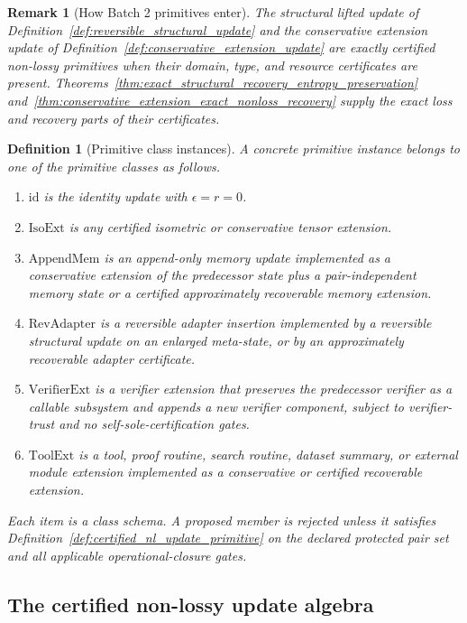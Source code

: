 \documentclass[11pt]{article}
\newtheorem{definition}[theorem]{Definition}
\newtheorem{remark}[theorem]{Remark}
\newcommand{\1}{\mathbf{1}}
\begin{document}
\begin{remark}[How Batch 2 primitives enter]
The structural lifted update of Definition~\ref{def:reversible_structural_update} and the conservative extension update of Definition~\ref{def:conservative_extension_update} are exactly certified non-lossy primitives when their domain, type, and resource certificates are present.  Theorems~\ref{thm:exact_structural_recovery_entropy_preservation} and~\ref{thm:conservative_extension_exact_nonloss_recovery} supply the exact loss and recovery parts of their certificates.
\end{remark}

\begin{definition}[Primitive class instances]
\label{def:primitive_class_instances}
A concrete primitive instance belongs to one of the primitive classes as follows.
\begin{enumerate}[label=(\alph*),leftmargin=1.5em]
    \item \(\mathrm{id}\) is the identity update with \(\epsilon=r=0\).
    \item \(\mathrm{IsoExt}\) is any certified isometric or conservative tensor extension.
    \item \(\mathrm{AppendMem}\) is an append-only memory update implemented as a conservative extension of the predecessor state plus a pair-independent memory state or a certified approximately recoverable memory extension.
    \item \(\mathrm{RevAdapter}\) is a reversible adapter insertion implemented by a reversible structural update on an enlarged meta-state, or by an approximately recoverable adapter certificate.
    \item \(\mathrm{VerifierExt}\) is a verifier extension that preserves the predecessor verifier as a callable subsystem and appends a new verifier component, subject to verifier-trust and no self-sole-certification gates.
    \item \(\mathrm{ToolExt}\) is a tool, proof routine, search routine, dataset summary, or external module extension implemented as a conservative or certified recoverable extension.
\end{enumerate}
Each item is a class schema.  A proposed member is rejected unless it satisfies Definition~\ref{def:certified_nl_update_primitive} on the declared protected pair set and all applicable operational-closure gates.
\end{definition}

\subsection{The certified non-lossy update algebra}
\end{document}
